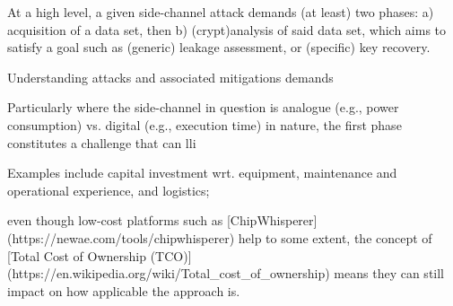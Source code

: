 At a high level, a given side-channel attack demands (at least) two phases:
a) acquisition of a data set,
   then
b) (crypt)analysis of said data set, which aims to satisfy a goal such as
   (generic) leakage assessment, or (specific) key recovery.

Understanding attacks and associated mitigations demands 

Particularly where the side-channel in question is
analogue (e.g., power consumption)
vs.
 digital (e.g., execution time)
in nature, the first phase constitutes a challenge that can lli


Examples include
capital investment wrt. equipment, maintenance and operational experience, and logistics;



even though low-cost platforms such as
[ChipWhisperer](https://newae.com/tools/chipwhisperer)
help to some extent, the concept of
[Total Cost of Ownership (TCO)](https://en.wikipedia.org/wiki/Total_cost_of_ownership)
means they can still impact on how applicable the approach is.

